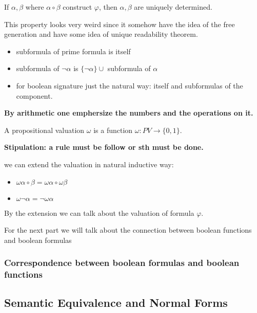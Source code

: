 \documentclass[11pt]{article}
\begin{document}
\begin{theorem}
If \(\alpha, \beta\) where \(\alpha \circ \beta\) construct \(\varphi\), then \(\alpha, \beta\) are uniquely determined.
\end{theorem}

This property looks very weird since it somehow have the idea of the free generation and have some idea of unique readability theorem.

\begin{definition}
\begin{itemize}
\item subformula of prime formula is itself
\item subformula of \(\neg \alpha\) is \(\{\neg \alpha\} \cup\) subformula of \(\alpha\)
\item for boolean signature just the natural way: itself and subformulas of the component.
\end{itemize}
\end{definition}

\textbf{By arithmetic one emphersize the numbers and the operations on it.}

\begin{definition}
A propositional valuation \(\omega\) is a function \(\omega:PV \to \{0,1\}\).
\end{definition}

\textbf{Stipulation: a rule must be follow or sth must be done.}

we can extend the valuation in natural inductive way:
\begin{itemize}
\item \(\omega\alpha \circ \beta = \omega\alpha \circ \omega\beta\)
\item \(\omega\neg\alpha = \neg\omega\alpha\)
\end{itemize}

By the extension we can talk about the valuation of formula \(\varphi\).

For the next part we will talk about the connection between boolean functions and boolean formulas
\subsubsection{Correspondence between boolean formulas and boolean functions}
\label{sec:org8c01bcf}
\subsection{Semantic Equivalence and Normal Forms}
\label{sec:orgca3f5ef}
\end{document}
